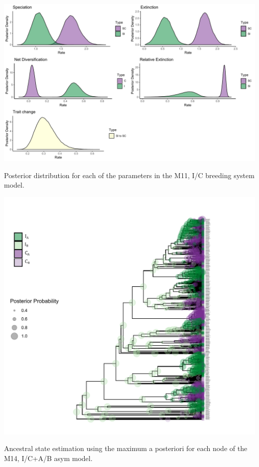\begin{suppfigure}
\includegraphics[width=\textwidth]{bisseSIposteriordist.pdf}
\caption{Posterior distribution for each of the parameters in the M11, I/C breeding system model.} %
\label{suppfigure:IC}
\end{suppfigure}

\begin{suppfigure}
\includegraphics[width=\textwidth]{asrICAB.pdf}
\caption{Ancestral state estimation using the maximum a posteriori for each node of the M14, I/C+A/B asym model.} %
\label{suppfigure:ICABasr}
\end{suppfigure}

